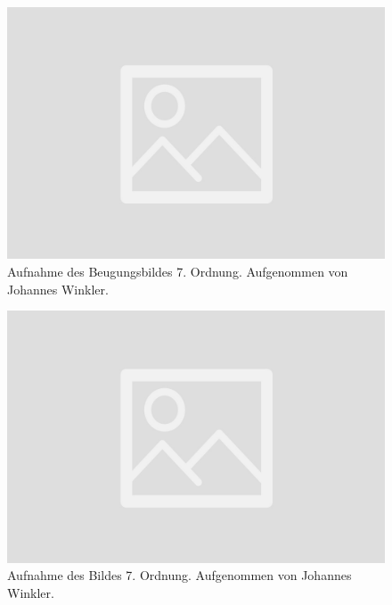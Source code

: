 \documentclass{article}
\begin{document}
\begin{minipage}[t]{.45\textwidth}
\begin{figure}[H]
\includegraphics[scale=0.1]{jw/Beugungsbild_7.jpg}
\caption{Aufnahme des Beugungsbildes 7. Ordnung. Aufgenommen von Johannes Winkler.}
\label{fig:bbild_7_jw}
\end{figure}
\end{minipage}
\hfill
\noindent
\begin{minipage}[t]{.45\textwidth}
\begin{figure}[H]
\includegraphics[scale=0.1]{jw/Bild_7.jpg}
\caption{Aufnahme des Bildes 7. Ordnung. Aufgenommen von Johannes Winkler.}\label{fig:bild_7_jw}
\end{figure}
\end{minipage}
\end{document}
